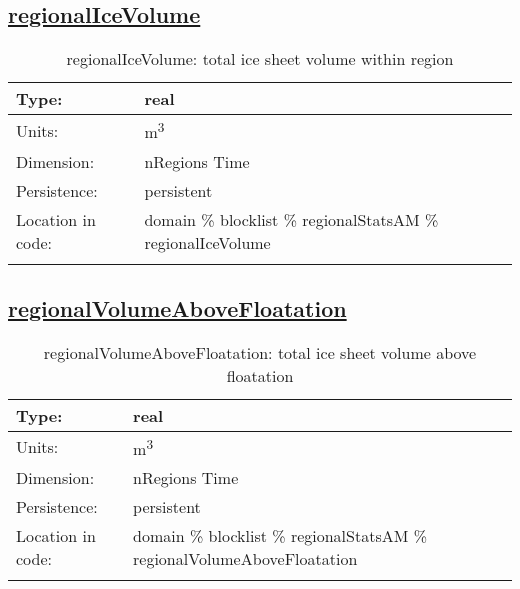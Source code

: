 \subsection[regionalIceVolume]{\hyperref[sec:var_tab_regionalStatsAM]{regionalIceVolume}}
\label{subsec:var_sec_regionalStatsAM_regionalIceVolume}
\begin{center}
\begin{longtable}{| p{2.0in} | p{4.0in} |}
        \hline 
        Type: & real \\
        \hline 
        Units: & \si{m^3} \\
        \hline 
        Dimension: & nRegions Time \\
        \hline 
        Persistence: & persistent \\
        \hline 
         Location in code: & domain \% blocklist \% regionalStatsAM \% regionalIceVolume \\
         \hline 
    \caption{regionalIceVolume: total ice sheet volume within region}
\end{longtable}
\end{center}
\subsection[regionalVolumeAboveFloatation]{\hyperref[sec:var_tab_regionalStatsAM]{regionalVolumeAboveFloatation}}
\label{subsec:var_sec_regionalStatsAM_regionalVolumeAboveFloatation}
\begin{center}
\begin{longtable}{| p{2.0in} | p{4.0in} |}
        \hline 
        Type: & real \\
        \hline 
        Units: & \si{m^3} \\
        \hline 
        Dimension: & nRegions Time \\
        \hline 
        Persistence: & persistent \\
        \hline 
         Location in code: & domain \% blocklist \% regionalStatsAM \% regionalVolumeAboveFloatation \\
         \hline 
    \caption{regionalVolumeAboveFloatation: total ice sheet volume above floatation}
\end{longtable}
\end{center}
